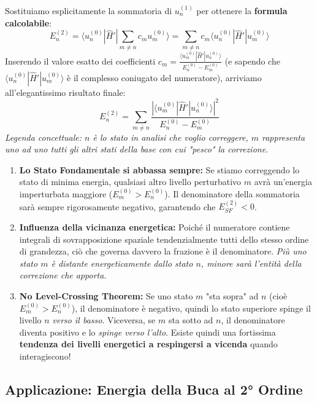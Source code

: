 \documentclass[11pt, a4paper]{article}
\begin{document}
\noindent
Sostituiamo esplicitamente la sommatoria di $u_n^{(1)}$ per ottenere la \textbf{formula calcolabile}: %
\begin{equation*}
    E_n^{(2)} = \langle u_n^{(0)} | \hat{H}' | \sum_{m \neq n} c_m u_m^{(0)} \rangle = \sum_{m \neq n} c_m \langle u_n^{(0)} | \hat{H}' | u_m^{(0)} \rangle %
\end{equation*}
Inserendo il valore esatto dei coefficienti $c_m = \frac{\langle u_m^{(0)} | \hat{H}' | u_n^{(0)} \rangle}{E_n^{(0)} - E_m^{(0)}}$ (e sapendo che $\langle u_n^{(0)} | \hat{H}' | u_m^{(0)} \rangle$ è il complesso coniugato del numeratore), arriviamo all'elegantissimo risultato finale: %
\begin{equation}
    \boxed{ E_n^{(2)} = \sum_{m \neq n} \frac{ |\langle u_m^{(0)} | \hat{H}' | u_n^{(0)} \rangle|^2 }{E_n^{(0)} - E_m^{(0)}} } %
\end{equation}
\textit{Legenda concettuale: $n$ è lo stato in analisi che voglio correggere, $m$ rappresenta uno ad uno tutti gli altri stati della base con cui "pesco" la correzione.} %

\begin{enumerate}
    \item \textbf{Lo Stato Fondamentale si abbassa sempre:} Se stiamo correggendo lo stato di minima energia, qualsiasi altro livello perturbativo $m$ avrà un'energia imperturbata maggiore ($E_m^{(0)} > E_n^{(0)}$). Il denominatore della sommatoria sarà sempre rigorosamente negativo, garantendo che $E_{SF}^{(2)} < 0$. %
    \item \textbf{Influenza della vicinanza energetica:} Poiché il numeratore contiene integrali di sovrapposizione spaziale tendenzialmente tutti dello stesso ordine di grandezza, ciò che governa davvero la frazione è il denominatore. \textit{Più uno stato $m$ è distante energeticamente dallo stato $n$, minore sarà l'entità della correzione che apporta.} %
    \item \textbf{No Level-Crossing Theorem:} Se uno stato $m$ "sta sopra" ad $n$ (cioè $E_m^{(0)} > E_n^{(0)}$), il denominatore è negativo, quindi lo stato superiore spinge il livello $n$ \textit{verso il basso}. Viceversa, se $m$ sta sotto ad $n$, il denominatore diventa positivo e lo \textit{spinge verso l'alto}. Esiste quindi una fortissima \textbf{tendenza dei livelli energetici a respingersi a vicenda} quando interagiscono! %
\end{enumerate}

\subsection{Applicazione: Energia della Buca al 2° Ordine} %
\end{document}
